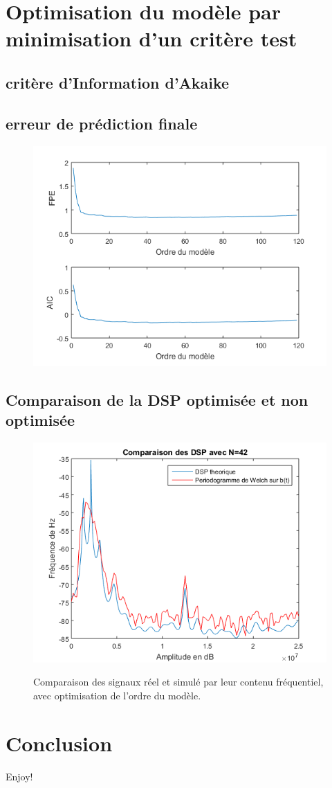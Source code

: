 \documentclass[a4paper]{article}
\begin{document}
\section{Optimisation du modèle par minimisation d'un critère test}

\subsection{critère d'Information d'Akaike}
\subsection{erreur de prédiction finale}

\begin{figure}[!h]
	\centering
	\includegraphics[scale=0.5]{criteres.png}
    \label{criteres}
    \caption{}
\end{figure}

\subsection{Comparaison de la DSP optimisée et non optimisée}

\begin{figure}[!h]
	\centering
	\includegraphics[scale=0.5]{otpi.png}
    \label{opti}
    \caption{Comparaison des signaux réel et simulé par leur contenu fréquentiel, avec optimisation de l'ordre du modèle.}
\end{figure}

\section{Conclusion}
Enjoy!
\end{document}
